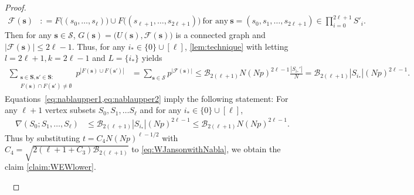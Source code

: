 \documentclass[letterpaper,11pt]{article}
\newcommand{\Vsize}{N}
\newcommand{\pmax}{p}
\newcommand{\Slc}{\mathbf{S}}
\newcommand{\Vs}{U}
\newcommand{\Es}{F}
\def\defeq{\mathrel{\mathop:}=}%
\begin{document}
\begin{proof}
\begin{align*}
\mathcal{F}(\mathbf{s})&\defeq \Es\bigl((s_0, \ldots, s_{\ell})\bigr)\cup \Es\bigl((s_{\ell+1},\ldots, s_{2\ell+1})\bigr)\ \textrm{for any}\ \mathbf{s}=(s_0, s_1, \ldots, s_{2\ell+1})\in \prod_{i=0}^{2\ell+1}S'_i.
\end{align*}
Then for any $\mathbf{s}\in \mathcal{S}$, 
$G({\mathbf{s}})=\bigl(\Vs({\mathbf{s}}), \mathcal{F}(\mathbf{s})\bigr)$ is a connected graph 
and $|\mathcal{F}(\mathbf{s})|\leq 2\ell-1$.
Thus, for any $i_* \in \{0\} \cup [\ell]$, \cref{lem:technique} with letting $l=2\ell+1,k=2\ell-1$ and $L=\{i_*\}$ yields
\begin{align}
\sum_{\substack{\mathbf{s}\in \Slc,\mathbf{s}'\in \Slc:\\\Es(\mathbf{s})\cap \Es(\mathbf{s}')\neq \emptyset}}
p^{|\Es(\mathbf{s})\cup \Es(\mathbf{s}')|}
&=\sum_{\mathbf{s}\in \mathcal{S}}p^{|\mathcal{F}(\mathbf{s})|}
\leq \mathcal{B}_{2(\ell+1)}\Vsize(\Vsize\pmax)^{2\ell-1}\frac{|S_{i_*}'|}{\Vsize}
=\mathcal{B}_{2(\ell+1)}|S_{i_*}|(\Vsize \pmax)^{2\ell-1}.
\label{eq:nablaupper2}
\end{align}
Equations~\cref{eq:nablaupper1,eq:nablaupper2} imply the following statement:
For any $\ell+1$ vertex subsets $S_0, S_1, \ldots S_\ell$ and for any $i_*\in \{0\}\cup [\ell]$, %
\begin{align}
\nabla(S_0;S_1,\ldots,S_\ell)
&\leq \mathcal{B}_{2(\ell+1)}|S_{i_*}|(\Vsize \pmax)^{2\ell-1}
\leq \mathcal{B}_{2(\ell+1)}\Vsize (\Vsize \pmax)^{2\ell-1}.
\label{claim:nablaupper}
\end{align}
Thus by substituting $t=C_4 \Vsize(\Vsize \pmax)^{\ell-1/2}$ with $C_4=\sqrt{2(\ell+1+C_3)\mathcal{B}_{2(\ell+1)}}$ to \cref{eq:WJansonwithNabla}, we obtain the claim \cref{claim:WEWlower}.

\


\end{proof}
\end{document}
